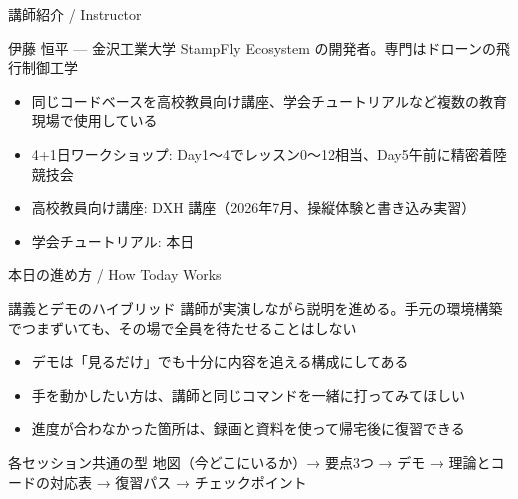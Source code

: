 \begin{frame}{講師紹介 / Instructor}
  \begin{block}{伊藤 恒平 --- 金沢工業大学}
    \small StampFly Ecosystem の開発者。専門はドローンの飛行制御工学
  \end{block}

  \vspace{0.5em}

  \begin{itemize}\small
    \item 同じコードベースを高校教員向け講座、学会チュートリアルなど複数の教育現場で使用している
    \item 4+1日ワークショップ: Day1〜4でレッスン0〜12相当、Day5午前に精密着陸競技会
    \item 高校教員向け講座: DXH 講座（2026年7月、操縦体験と書き込み実習）
    \item 学会チュートリアル: 本日
  \end{itemize}
\end{frame}

\begin{frame}{本日の進め方 / How Today Works}
  \begin{block}{講義とデモのハイブリッド}
    \small 講師が実演しながら説明を進める。手元の環境構築でつまずいても、その場で全員を待たせることはしない
  \end{block}

  \vspace{0.3em}

  \begin{itemize}\small
    \item デモは「見るだけ」でも十分に内容を追える構成にしてある
    \item 手を動かしたい方は、講師と同じコマンドを一緒に打ってみてほしい
    \item 進度が合わなかった箇所は、録画と資料を使って帰宅後に復習できる
  \end{itemize}

  \vspace{0.3em}

  \begin{alertblock}{各セッション共通の型}
    \footnotesize 地図（今どこにいるか）→ 要点3つ → デモ → 理論とコードの対応表 → 復習パス → チェックポイント
  \end{alertblock}
\end{frame}

